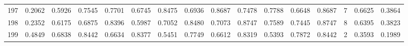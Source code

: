 \begin{tabular}{lrrrrrrrrrrrrrrr}
197 &      0.2062 &  0.5926 &  0.7545 &  0.7701 &  0.6745 &  0.8475 &  0.6936 &  0.8687 &  0.7478 &  0.7788 &   0.6648 &     0.8687 &      7 &                    0.6625 &                     0.3864 \\
198 &      0.2352 &  0.6175 &  0.6875 &  0.8396 &  0.5987 &  0.7052 &  0.8480 &  0.7073 &  0.8747 &  0.7589 &   0.7445 &     0.8747 &      8 &                    0.6395 &                     0.3823 \\
199 &      0.4849 &  0.6838 &  0.8442 &  0.6634 &  0.8377 &  0.5451 &  0.7749 &  0.6612 &  0.8319 &  0.5393 &   0.7872 &     0.8442 &      2 &                    0.3593 &                     0.1989 \\
\bottomrule
\end{tabular}
